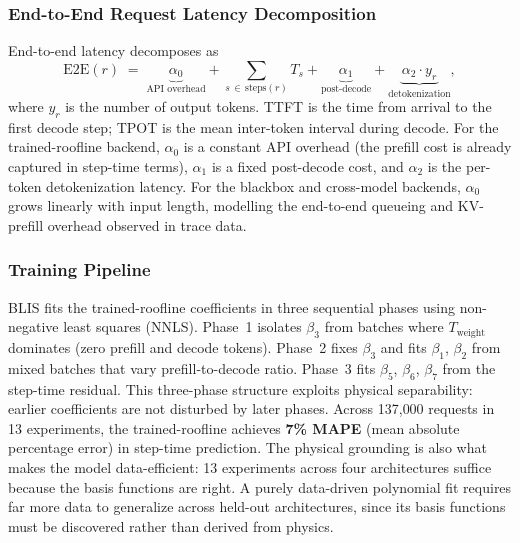 \documentclass[11pt]{article}
\theoremstyle{plain} %
\theoremstyle{definition} %
\theoremstyle{remark} %
\numberwithin{equation}{section}
\begin{document}
\subsubsection{End-to-End Request Latency Decomposition}
\label{subsubsec:e2e-decomp}

End-to-end latency decomposes as
\begin{equation}
  \mathrm{E2E}(r) \;=\;
  \underbrace{\alpha_0}_{\text{API overhead}}
  + \sum_{s \,\in\, \mathrm{steps}(r)} T_s
  + \underbrace{\alpha_1}_{\text{post-decode}}
  + \underbrace{\alpha_2 \cdot y_r}_{\text{detokenization}},
  \label{eq:e2e}
\end{equation}
where $y_r$ is the number of output tokens.
TTFT is the time from arrival to the first decode step; TPOT is the mean
inter-token interval during decode.
For the trained-roofline backend, $\alpha_0$ is a constant API overhead (the
prefill cost is already captured in step-time terms), $\alpha_1$ is a fixed
post-decode cost, and $\alpha_2$ is the per-token detokenization latency.
For the blackbox and cross-model backends, $\alpha_0$ grows linearly with
input length, modelling the end-to-end queueing and KV-prefill overhead observed
in trace data.

\subsubsection{Training Pipeline}
\label{subsubsec:training}

\begin{sloppypar}
BLIS fits the trained-roofline coefficients in three sequential phases using
non-negative least squares (NNLS).
Phase~1 isolates $\beta_3$ from batches where $T_\text{weight}$ dominates
(zero prefill and decode tokens).
Phase~2 fixes $\beta_3$ and fits $\beta_1$, $\beta_2$ from mixed batches that
vary prefill-to-decode ratio.
Phase~3 fits $\beta_5$, $\beta_6$, $\beta_7$ from the step-time residual.
This three-phase structure exploits physical separability: earlier
coefficients are not disturbed by later phases.
Across 137{,}000 requests in 13 experiments, the trained-roofline achieves
\textbf{7\% MAPE} (mean absolute percentage error) in step-time prediction.
The physical grounding is also what makes the model data-efficient: 13 experiments
across four architectures suffice because the basis functions are right.
A purely data-driven polynomial fit requires far more data to generalize across
held-out architectures, since its basis functions must be discovered rather than
derived from physics.
\end{sloppypar}
\end{document}
